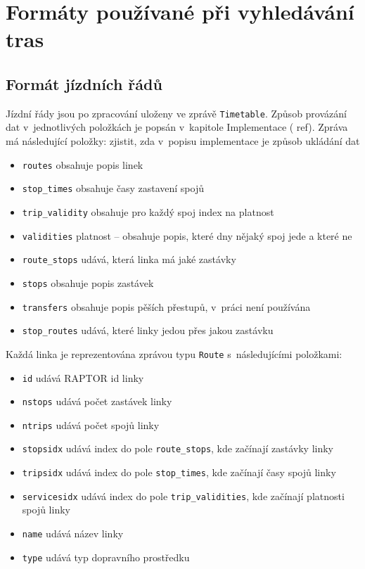 \section{Formáty používané při vyhledávání tras}
\label{ch:formaty-dat:vyhledavani}
\subsection{Formát jízdních řádů}
Jízdní řády jsou po zpracování uloženy ve zprávě {\tt Timetable}. Způsob
provázání dat v~jednotlivých položkách je popsán v~kapitole Implementace (\TODO
ref). Zpráva má následující položky:
\TODO zjistit, zda v~popisu implementace je způsob ukládání dat
\begin{itemize}
	\item {\tt routes} obsahuje popis linek
	\item {\tt stop\_times} obsahuje časy zastavení spojů 
	\item {\tt trip\_validity} obsahuje pro každý spoj index na platnost 
	\item {\tt validities} platnost -- obsahuje popis, které dny nějaký spoj
	jede a které ne 
	\item {\tt route\_stops} udává, která linka má jaké zastávky 
	\item {\tt stops} obsahuje popis zastávek
	\item {\tt transfers} obsahuje popis pěších přestupů, v~práci není
	používána 
	\item {\tt stop\_routes} udává, které linky jedou přes jakou zastávku
\end{itemize} 
Každá linka je reprezentována zprávou typu {\tt Route} s~následujícími
položkami:
\begin{itemize}
	\item {\tt id} udává RAPTOR id linky 
	\item {\tt nstops} udává počet zastávek linky
	\item {\tt ntrips} udává počet spojů linky
	\item {\tt stopsidx} udává index do pole {\tt route\_stops}, kde
	začínají zastávky linky
	\item {\tt tripsidx} udává index do pole {\tt stop\_times}, kde
	začínají časy spojů linky
	\item {\tt servicesidx} udává index do pole {\tt trip\_validities}, kde
	začínají platnosti spojů linky
	\item {\tt name} udává název linky
	\item {\tt type} udává typ dopravního prostředku
\end{itemize}
